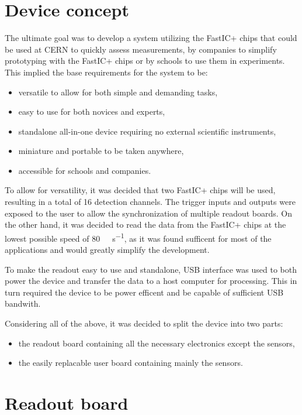 
\section{Device concept}
The ultimate goal was to develop a system utilizing the FastIC+ chips that could be used at CERN to quickly assess measurements, by companies to simplify prototyping with the FastIC+ chips or by schools to use them in experiments. This implied the base requirements for the system to be:
\begin{itemize}
    \item versatile to allow for both simple and demanding tasks,
    \item easy to use for both novices and experts,
    \item standalone all-in-one device requiring no external scientific instruments,
    \item miniature and portable to be taken anywhere,
    \item accessible for schools and companies.
\end{itemize}

To allow for versatility, it was decided that two FastIC+ chips will be used, resulting in a total of 16 detection channels. The trigger inputs and outputs were exposed to the user to allow the synchronization of multiple readout boards. On the other hand, it was decided to read the data from the FastIC+ chips at the lowest possible speed of \SI{80}{\mega\bit\per\second}, as it was found sufficent for most of the applications and would greatly simplify the development.

To make the readout easy to use and standalone, USB interface was used to both power the device and transfer the data to a host computer for processing. This in turn required the device to be power efficent and be capable of sufficient USB bandwith.

Considering all of the above, it was decided to split the device into two parts: 
\begin{itemize}
    \item the readout board containing all the necessary electronics except the sensors,
    \item the easily replacable user board containing mainly the sensors.
\end{itemize}

\section{Readout board}

